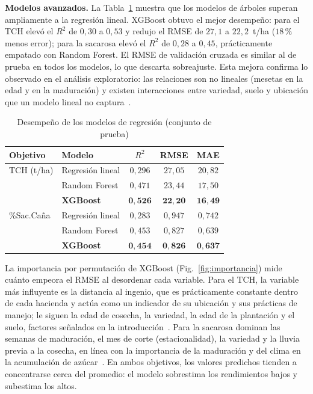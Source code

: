\documentclass[conference]{IEEEtran}
\begin{document}
\textbf{Modelos avanzados.} La Tabla~\ref{tab:regresion} muestra que los modelos de árboles superan ampliamente a la regresión lineal. XGBoost obtuvo el mejor desempeño: para el TCH elevó el $R^2$ de $0{,}30$ a $0{,}53$ y redujo el RMSE de $27{,}1$ a $22{,}2$~t/ha ($18\,\%$ menos error); para la sacarosa elevó el $R^2$ de $0{,}28$ a $0{,}45$, prácticamente empatado con Random Forest. El RMSE de validación cruzada es similar al de prueba en todos los modelos, lo que descarta sobreajuste. Esta mejora confirma lo observado en el análisis exploratorio: las relaciones son no lineales (mesetas en la edad y en la maduración) y existen interacciones entre variedad, suelo y ubicación que un modelo lineal no captura~\cite{revision2025a,revision2025b}.

\begin{table}[!t]
\caption{Desempeño de los modelos de regresión (conjunto de prueba)}
\label{tab:regresion}
\centering
\begin{tabular}{llccc}
\toprule
Objetivo & Modelo & $R^2$ & RMSE & MAE \\
\midrule
TCH (t/ha) & Regresión lineal & $0{,}296$ & $27{,}05$ & $20{,}82$ \\
           & Random Forest    & $0{,}471$ & $23{,}44$ & $17{,}50$ \\
           & \textbf{XGBoost} & $\mathbf{0{,}526}$ & $\mathbf{22{,}20}$ & $\mathbf{16{,}49}$ \\
\midrule
\%Sac.Caña & Regresión lineal & $0{,}283$ & $0{,}947$ & $0{,}742$ \\
           & Random Forest    & $0{,}453$ & $0{,}827$ & $0{,}639$ \\
           & \textbf{XGBoost} & $\mathbf{0{,}454}$ & $\mathbf{0{,}826}$ & $\mathbf{0{,}637}$ \\
\bottomrule
\end{tabular}
\end{table}

La importancia por permutación de XGBoost (Fig.~\ref{fig:importancia}) mide cuánto empeora el RMSE al desordenar cada variable. Para el TCH, la variable más influyente es la distancia al ingenio, que es prácticamente constante dentro de cada hacienda y actúa como un indicador de su ubicación y sus prácticas de manejo; le siguen la edad de cosecha, la variedad, la edad de la plantación y el suelo, factores señalados en la introducción~\cite{cenicana}. Para la sacarosa dominan las semanas de maduración, el mes de corte (estacionalidad), la variedad y la lluvia previa a la cosecha, en línea con la importancia de la maduración y del clima en la acumulación de azúcar~\cite{cenicana}. En ambos objetivos, los valores predichos tienden a concentrarse cerca del promedio: el modelo sobrestima los rendimientos bajos y subestima los altos.
\end{document}
